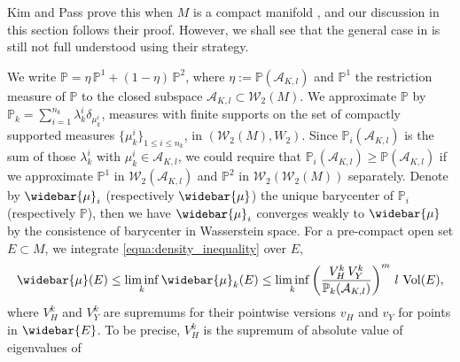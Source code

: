Kim and Pass prove this  when $M$ is a compact manifold
\cite[Theorem 6.2]{KIM2017640},
and our discussion in this section follows their proof.
However, we shall see that the general case in  is still not
full understood using their strategy.

We write $\mathbb{P} = \eta\, \mathbb{P}^1 + (1 - \eta)\, \mathbb{P}^2$, where
$\eta := \mathbb{P}(\mathcal{A}_{K,l})$ and $\mathbb{P}^1$ the
restriction measure of $\mathbb{P}$ to the closed subspace $\mathcal{A}_{K,l} \subset \mathcal{W}_2(M)$.
We approximate $\mathbb{P}$ by $ \mathbb{P}_k = \sum_{i=1}^{n_k} \lambda_k^i \delta_{\mu_k^i} $,
measures with finite supports on the set of compactly supported measures
$\{ \mu_k^i\}_{1 \leq i \leq n_k}$, in $(\mathcal{W}_2(M), W_2)$.
Since $\mathbb{P}_i(\mathcal{A}_{K,l})$ is the sum of those $\lambda_k^i$ with $\mu_k^i \in \mathcal{A}_{K,l}$,
we could require that $\mathbb{P}_i (\mathcal{A}_{K,l}) \geq \mathbb{P} (\mathcal{A}_{K,l})$
if we approximate $\mathbb{P}^1 $ in $\mathcal{W}_2(\mathcal{A}_{K,l})$
and $\mathbb{P}^2$ in $\mathcal{W}_2(\mathcal{W}_2(M))$ separately.
Denote by $\widebar{\mu}_i$ (respectively $\widebar{\mu}$) the unique barycenter of
$\mathbb{P}_i$ (respectively $\mathbb{P}$),
then we have $\widebar{\mu}_i$ converges weakly to $\widebar{\mu}$ by the consistence of barycenter
in Wasserstein space.
For a pre-compact open set $E \subset M$,
we integrate \cref{equa:density_inequality} over $E$,
\begin{equation}
	\label{equa:absolute_continuity_general_case}
	\widebar{\mu}(E) \leq \liminf_k \widebar{\mu}_k(E) \leq
	\liminf_k \left( \frac{V_H^k\, V_Y^k}{\mathbb{P}_k(\mathcal{A}_{K,l})}\right)^m
	\,l\, \operatorname{Vol}(E),
\end{equation}
where $V_H^k$ and $V_Y^k$ are supremums for their pointwise versions $v_H$ and $v_Y$ for points in $\widebar{E}$.
To be precise, $V_H^k$ is the supremum of absolute value of eigenvalues of
